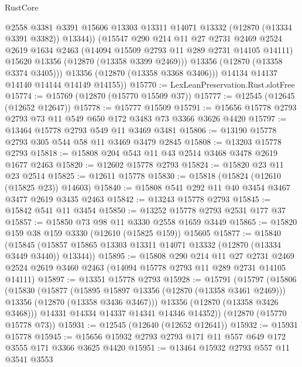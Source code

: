 \begin{lexlean}{RustCore}
\begin{coremodule}
                @2558
                @3381
                @3391
                @15606
                @13303
                @13311
                @14071
                @13332
                (@12870 (@13334 @3391 @3382))
                @13344))
            (@15547
              @290
              @214
              @11
              @27
              @2731
              @2469
              @2524
              @2619
              @1634
              @2463
              (@14094 @15509 @2793 @11 @289 @2731 @14105 @14111)
              @15620
              @13356
              (@12870 (@13358 @3399 @2469)))
            @13356
            (@12870 (@13358 @3374 @3405)))
          @13356
          (@12870 (@13358 @3368 @3406)))
        @14134
        @14137
        @14140
        @14144
        @14149
        @14155))
@15770 := LexLeanPreservation.Rust.slotFree
@15774 := @15769 (@12870 (@15770 @15509 @37))
@15777 := @12545 (@12645 (@12652 @12647))
@15778 := @15777 @15509
@15791 := @15656 @15778 @2793 @2793 @73 @11 @549 @650 @172 @3483 @73 @3366 @3626 @4420
@15797 := @13464 @15778 @2793 @549 @11 @3469 @3481
@15806 := @13190 @15778 @2793 @305 @544 @58 @11 @3469 @3479 @2845
@15808 := @13203 @15778 @2793
@15818 := @15808 @204 @543 @11 @43 @2514 @3468 @3478 @2619 @1677 @2463
@15820 := @12602 @15778 @2793
@15824 := @15820 @23 @11 @23 @2514
@15825 := @12611 @15778
@15830 := @15818 (@15824 (@12610 (@15825 @23)) @14603)
@15840 := @15808 @541 @292 @11 @40 @3454 @3467 @3477 @2619 @3435 @2463
@15842 := @13243 @15778 @2793
@15845 := @15842 @541 @11 @3454
@15850 := @13252 @15778 @2793 @2531 @177 @37
@15857 := @15850 @73 @98 @11 @3330 @2558 @1659 @3449
@15865 := @15820 @159 @38 @159 @3330 (@12610 (@15825 @159)) @15605
@15877 := @15840
    (@15845 (@15857 @15865 @13303 @13311 @14071 @13332 (@12870 (@13334 @3449 @3440)) @13344))
@15895 := @15808
    @290
    @214
    @11
    @27
    @2731
    @2469
    @2524
    @2619
    @3460
    @2463
    (@14094 @15778 @2793 @11 @289 @2731 @14105 @14111)
@15897 := @13351 @15778 @2793
@15928 := @15791
    (@15797
      (@15806
        (@15830
          (@15877
            (@15895 @15897 @13356 (@12870 (@13358 @3461 @2469)))
            @13356
            (@12870 (@13358 @3436 @3467)))
          @13356
          (@12870 (@13358 @3426 @3468)))
        @14331
        @14334
        @14337
        @14341
        @14346
        @14352))
    (@12870 (@15770 @15778 @73))
@15931 := @12545 (@12640 (@12652 @12641))
@15932 := @15931 @15778
@15945 := @15656 @15932 @2793 @2793 @171 @11 @557 @649 @172 @3555 @171 @3366 @3625 @4420
@15951 := @13464 @15932 @2793 @557 @11 @3541 @3553

\end{coremodule}
\end{lexlean}
